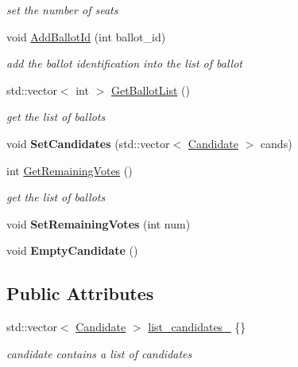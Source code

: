 \begin{DoxyCompactItemize}
\begin{DoxyCompactList}\small\item\em set the number of seats \end{DoxyCompactList}\item 
void \hyperlink{classParty_ad9dff61f9195359c440020ccebb4a5dd}{Add\+Ballot\+Id} (int ballot\+\_\+id)
\begin{DoxyCompactList}\small\item\em add the ballot identification into the list of ballot \end{DoxyCompactList}\item 
std\+::vector$<$ int $>$ \hyperlink{classParty_a7a97cdb859c34604b1a952df0151b7f3}{Get\+Ballot\+List} ()
\begin{DoxyCompactList}\small\item\em get the list of ballots \end{DoxyCompactList}\item 
\mbox{\label{classParty_ace4d8c5a1fb58af2ece9136278bca5cf}} 
void {\bfseries Set\+Candidates} (std\+::vector$<$ \hyperlink{classCandidate}{Candidate} $>$ cands)
\item 
int \hyperlink{classParty_a7f58024b3b948f2e9779f766a267c8a7}{Get\+Remaining\+Votes} ()
\begin{DoxyCompactList}\small\item\em get the list of ballots \end{DoxyCompactList}\item 
\mbox{\label{classParty_ae0f2702fc682c32fcefae7067efb22a8}} 
void {\bfseries Set\+Remaining\+Votes} (int num)
\item 
\mbox{\label{classParty_a16a67b58cf4dd79670a41820e8734a9a}} 
void {\bfseries Empty\+Candidate} ()
\end{DoxyCompactItemize}
\subsection*{Public Attributes}
\begin{DoxyCompactItemize}
\item 
std\+::vector$<$ \hyperlink{classCandidate}{Candidate} $>$ \hyperlink{classParty_a4d41ca10218671ecbc17ca75c4010822}{list\+\_\+candidates\+\_\+} \{\}
\begin{DoxyCompactList}\small\item\em candidate contains a list of candidates \end{DoxyCompactList}\end{DoxyCompactItemize}


